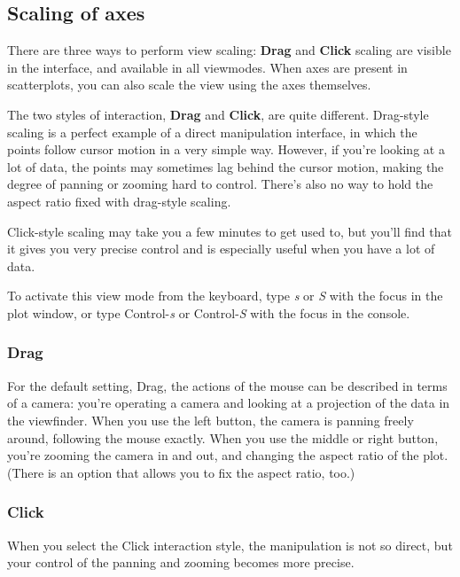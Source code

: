 \documentclass[11pt]{article}
\begin{document}
\subsection{Scaling of axes}
\label{slbl:Scaling}

There are three ways to perform view scaling:  {\bf Drag} and {\bf Click}
scaling are visible in the interface, and available in all viewmodes.
When axes are present in scatterplots, you can also scale the
view using the axes themselves.

The two styles of interaction, {\bf Drag} and {\bf Click}, are quite
different.  Drag-style scaling is a perfect example of a direct
manipulation interface, in which the points follow cursor motion in a
very simple way.  However, if you're looking at a lot of data, the
points may sometimes lag behind the cursor motion, making the degree
of panning or zooming hard to control.  There's also no way to
hold the aspect ratio fixed with drag-style scaling.

Click-style scaling may take you a few minutes to get used to, but
you'll find that it gives you very precise control and is especially
useful when you have a lot of data.

To activate this view mode from the keyboard, type {\em s} or {\em S}
with the focus in the plot window, or type Control-{\em s} or
Control-{\em S} with the focus in the console.

\subsubsection{Drag}

For the default setting, Drag, the actions of the mouse can be
described in terms of a camera:  you're operating a camera and
looking at a projection of the data in the viewfinder.  When you use
the left button, the camera is panning freely around, following the
mouse exactly.  When you use the middle or right button, you're
zooming the camera in and out, and changing the aspect ratio of
the plot.  (There is an option that allows you to fix the
aspect ratio, too.)

\subsubsection{Click}

When you select the Click interaction style, the manipulation is
not so direct, but your control of the panning and zooming becomes
more precise.
\end{document}

